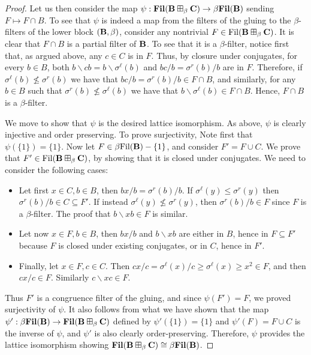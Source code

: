 \documentclass{amsart}
\theoremstyle{definition}
\numberwithin{equation}{section}
\newcommand{\alg}[1]{{\textbf{\upshape #1}}}  %
\newcommand{\sse}{\subseteq}
\newcommand{\sell}{\sigma^\ell}
\newcommand{\sr}{\sigma^r}
\newcommand{\fil}{\mathbf{Fil}}
\newcommand{\dfil}{{\rm Fil}}
\newcommand{\betafil}{\mathbf{\beta Fil}}
\newcommand{\dbetafil}{{\rm \beta Fil}}
\begin{document}
\begin{proof}
Let us then consider the map $\psi: \fil(\alg B \boxplus_\beta \alg C) \to \betafil(\alg B)$ sending $F \mapsto F \cap B$. To see that $\psi$ is indeed a map from the filters of the gluing to the $\beta$-filters of the lower block $(\alg B, \beta)$, consider any nontrivial $F \in \dfil(\alg B \boxplus_\beta \alg C)$. It is clear that $F \cap B$ is a partial filter of $\alg B$. To see that it is a $\beta$-filter, notice first that, as argued above, any $c \in C$ is in $F$. Thus, by closure under conjugates, for every $b \in B$, both $b \backslash cb = b \backslash \sell(b)$ and $bc / b = \sr(b) / b$ are in $F$. Therefore, if $\sell(b) \not\leq\sr(b)$ we have that $bc / b = \sr(b) /b \in F \cap B$, and similarly, for any $b \in B$ such that $\sr(b) \not\leq \sell(b)$ we have that $b \backslash \sell(b) \in F \cap B$. Hence, $F \cap B$ is a $\beta$-filter.

 We move to show that $\psi$ is the desired lattice isomorphism. As above, $\psi$ is clearly injective and order preserving. To prove surjectivity, Note first that $\psi(\{1\}) = \{1\}$. Now
 let $F \in \dbetafil(\alg B) - \{1\}$, and consider $F' = F \cup C$. We prove that $F' \in \dfil(\alg B \boxplus_\beta \alg C)$, by showing that it is closed under conjugates. We need to consider the following cases:
 \begin{itemize}
  	\item Let first $x \in C, b \in B$, then $bx /b = \sr(b) / b$. If $\sell(y) \leq \sr(y)$ then $\sr(b) / b \in C \sse F'$. If instead $\sell(y) \not\leq \sr(y)$, then $\sr(b) / b \in F$ since $F$ is a $\beta$-filter. The proof that $b \backslash xb \in F$ is similar. 
 	\item Let now $x \in F, b \in B$, then $bx /b$ and $b \backslash xb$ are either in $B$, hence in $F \sse F'$ because $F$ is closed under existing conjugates, or in $C$, hence in $F'$.
 	\item Finally, let $x \in F, c \in C$. Then $cx/c = \sell(x)/c \geq \sell(x) \geq x^2 \in F$, and then $cx/c \in F$. Similarly $c \backslash xc \in F$. 
 \end{itemize}

Thus $F'$ is a congruence filter of the gluing, and since $\psi(F') = F$, we proved surjectivity of $\psi$. It also follows from what we have shown that the map $\psi': \betafil(\alg B) \to \fil(\alg B \boxplus_\beta \alg C)$ defined by $\psi'(\{1\}) = \{1\}$ and $\psi'(F) = F \cup C$ is the inverse of $\psi$, and $\psi'$ is also clearly order-preserving. Therefore, $\psi$ provides the lattice isomorphism showing $\fil(\alg B \boxplus_\beta \alg C)\cong\betafil(\alg B)$.
\end{proof}
\end{document}
